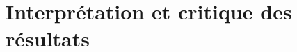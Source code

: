\documentclass[a4paper, 11pt, french]{report}
\begin{document}
                                                                                                                                                                                                                                                                      \section{Interprétation
                                                                                                                                                                                                                                                                      et
                                                                                                                                                                                                                                                                      critique
                                                                                                                                                                                                                                                                      des
                                                                                                                                                                                                                                                                      résultats}
                                                                                                                                                                                                                                                                        
\end{document}
